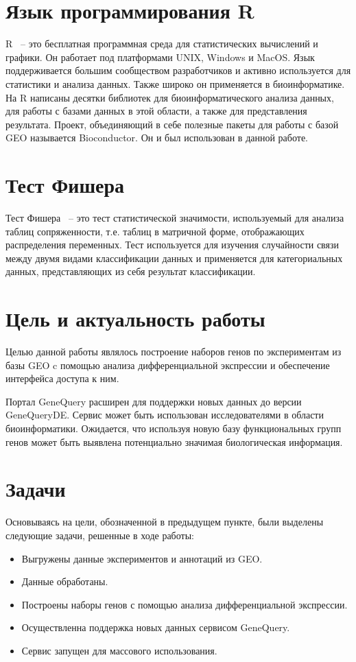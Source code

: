 \documentclass[times,specification,annotation]{itmo-student-thesis}
\begin{document}
\section{Язык программирования R}

R ~-- это бесплатная программная среда для статистических вычислений и графики.\cite{R} Он работает под платформами UNIX, Windows и MacOS. Язык поддерживается большим сообществом разработчиков и активно используется для статистики и анализа данных. Также широко он применяется в биоинформатике. На R написаны десятки библиотек для биоинформатического анализа данных, для работы с базами данных в этой области, а также для представления результата. Проект, объединяющий в себе полезные пакеты для работы с базой GEO называется Bioconductor. Он и был использован в данной работе.

\section{Тест Фишера}

Тест Фишера ~-- это тест статистической значимости, используемый для анализа таблиц сопряженности, т.е. таблиц в матричной форме, отображающих распределения переменных.\cite{Fisher} Тест используется для изучения случайности связи между двумя видами классификации данных и применяется для категориальных данных, представляющих из себя результат классификации.

\section{Цель и актуальность работы}

Целью данной работы являлось построение наборов генов по экспериментам из базы GEO c помощью анализа дифференциальной экспрессии и обеспечение интерфейса доступа к ним. 

Портал GeneQuery расширен для поддержки новых данных до версии GeneQueryDE. Сервис может быть использован исследователями в области биоинформатики. Ожидается, что используя новую базу функциональных групп генов может быть выявлена потенциально значимая биологическая информация. 

\section{Задачи}

Основываясь на цели, обозначенной в предыдущем пункте, были выделены следующие задачи, решенные в ходе работы:
\begin{itemize}
    \item Выгружены данные экспериментов и аннотаций из GEO.
    \item Данные обработаны.
    \item Построены наборы генов с помощью анализа дифференциальной экспрессии.
    \item Осуществленна поддержка новых данных сервисом GeneQuery.
    \item Сервис запущен для массового использования.
\end{itemize}
\end{document}
